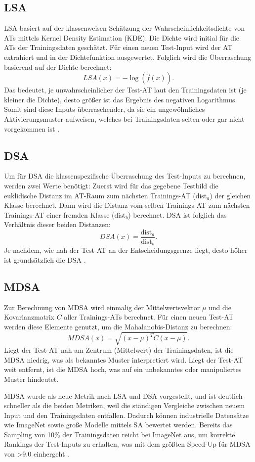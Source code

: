 \documentclass[sigconf, natbib=false]{acmart}
\begin{document}
\subsection{LSA}

LSA basiert auf der klassenweisen Schätzung der Wahrscheinlichkeitsdichte von ATs mittels Kernel Density Estimation (KDE). Die Dichte wird initial für die ATs der Trainingsdaten geschätzt. Für einen neuen Test-Input wird der AT extrahiert und in der Dichtefunktion ausgewertet. Folglich wird die Überraschung basierend auf der Dichte berechnet: $$LSA(x)=-\log(\hat{f}(x)).$$ Das bedeutet, je unwahrscheinlicher der Test-AT laut den Trainingsdaten ist (je kleiner die Dichte), desto größer ist das Ergebnis des negativen Logarithmus. Somit sind diese Inputs überraschender, da sie ein ungewöhnliches Aktivierungsmuster aufweisen, welches bei Trainingsdaten selten oder gar nicht vorgekommen ist \cite{sa_2}.

\subsection{DSA}

Um für DSA die klassenspezifische Überraschung des Test-Inputs zu berechnen, werden zwei Werte benötigt: Zuerst wird für das gegebene Testbild die euklidische Distanz im AT-Raum zum nächsten Trainings-AT ($\text{dist}_a$) der gleichen Klasse berechnet. Dann wird die Distanz vom selben Trainings-AT zum nächsten Trainings-AT einer fremden Klasse ($\text{dist}_b$) berechnet. DSA ist folglich das Verhältnis dieser beiden Distanzen: $$DSA(x)=\frac{\text{dist}_a}{\text{dist}_b}.$$ Je nachdem, wie nah der Test-AT an der Entscheidungsgrenze liegt, desto höher ist grundsätzlich die DSA \cite{sa_2}.

\subsection{MDSA}

Zur Berechnung von MDSA wird einmalig der Mittelwertsvektor $\mu$ und die Kovarianzmatrix $C$ aller Trainings-ATs berechnet. Für einen neuen Test-AT werden diese Elemente genutzt, um die Mahalanobis-Distanz zu berechnen: $$MDSA(x)=\sqrt{(x-\mu)^T C(x-\mu)}.$$ Liegt der Test-AT nah am Zentrum (Mittelwert) der Trainingsdaten, ist die MDSA niedrig, was als bekanntes Muster interpretiert wird. Liegt der Test-AT weit entfernt, ist die MDSA hoch, was auf ein unbekanntes oder manipuliertes Muster hindeutet. 

MDSA wurde als neue Metrik nach LSA und DSA vorgestellt, und ist deutlich schneller als die beiden Metriken, weil die ständigen Vergleiche zwischen neuem Input und den Trainingsdaten entfallen. Dadurch können industrielle Datensätze wie ImageNet sowie große Modelle mittels SA bewertet werden. Bereits das Sampling von 10\% der Trainingsdaten reicht bei ImageNet aus, um korrekte Rankings der Test-Inputs zu erhalten, was mit dem größten Speed-Up für MDSA von >9.0 einhergeht \cite{sa_2}.
\end{document}
